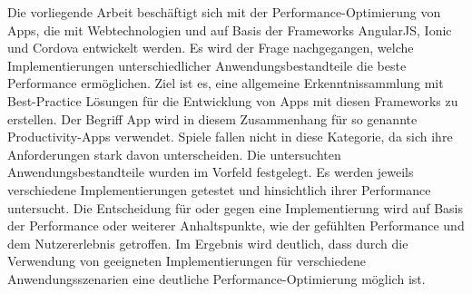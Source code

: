 
Die vorliegende Arbeit beschäftigt sich mit der Performance-Optimierung von Apps, die mit Webtechnologien und auf Basis der Frameworks AngularJS, Ionic und Cordova entwickelt werden. Es wird der Frage nachgegangen, welche Implementierungen unterschiedlicher Anwendungsbestandteile die beste Performance ermöglichen. Ziel ist es, eine allgemeine Erkenntnissammlung mit Best-Practice Lösungen für die Entwicklung von Apps mit diesen Frameworks zu erstellen. Der Begriff App wird in diesem Zusammenhang für so genannte \glqq Productivity\grqq{}-Apps verwendet. Spiele fallen nicht in diese Kategorie, da sich ihre Anforderungen stark davon unterscheiden. Die untersuchten Anwendungsbestandteile wurden im Vorfeld festgelegt. Es werden jeweils verschiedene Implementierungen getestet und hinsichtlich ihrer Performance untersucht. Die Entscheidung für oder gegen eine Implementierung wird auf Basis der Performance oder weiterer Anhaltspunkte, wie der \glqq gefühlten\grqq{} Performance und dem Nutzererlebnis getroffen. Im Ergebnis wird deutlich, dass durch die Verwendung von geeigneten Implementierungen für verschiedene Anwendungsszenarien eine deutliche Performance-Optimierung möglich ist.